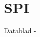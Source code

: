 \documentclass[../main]{subfiles}
\begin{document}
\section{SPI}
\label{sec:indledning}


Datablad -
\cite{xilinx2019fpga}
\end{document}

